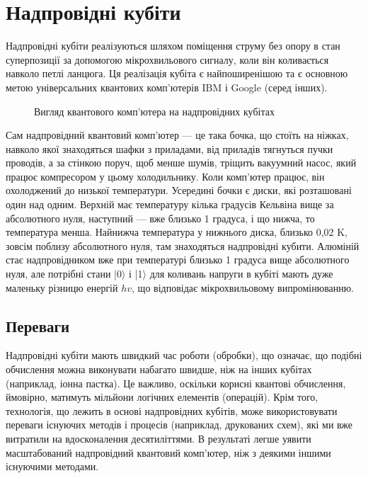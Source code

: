 \documentclass[a4paper,14pt]{extreport}
\begin{document}
\chapter{Надпровідні кубіти}\par 
Надпровідні кубіти реалізуються шляхом поміщення струму без опору в стан суперпозиції за допомогою мікрохвильового сигналу, коли він коливається навколо петлі ланцюга. Ця реалізація кубіта є найпоширенішою та є основною метою універсальних квантових комп’ютерів IBM і Google (серед інших).
\begin{figure}[h!]
\caption{Вигляд квантового комп'ютера на надпровідних кубітах}
\end{figure}
Сам надпровідний квантовий комп'ютер — це така бочка, що стоїть на ніжках, навколо якої знаходяться шафки з приладами, від приладів тягнуться пучки проводів, а за стінкою поруч, щоб менше шумів, тріщить вакуумний насос, який працює компресором у цьому холодильнику. Коли комп'ютер працює, він охолоджений до низької температури. Усередині бочки є диски, які розташовані один над одним. Верхній має температуру кілька градусів Кельвіна вище за абсолютного нуля, наступний — вже близько 1 градуса, і що нижча, то температура менша. Найнижча температура у нижнього диска, близько 0,02 K, зовсім поблизу абсолютного нуля, там знаходяться надпровідні кубити. Алюміній стає надпровідником вже при температурі близько 1 градуса вище абсолютного нуля, але потрібні стани |0$\rangle$ і |1$\rangle$ для коливань напруги в кубіті мають дуже маленьку різницю енергій $hv$, що відповідає мікрохвильовому випромінюванню.

\section{Переваги}
Надпровідні кубіти мають швидкий час роботи (обробки), що означає, що подібні обчислення можна виконувати набагато швидше, ніж на інших кубітах (наприклад, іонна пастка). Це важливо, оскільки корисні квантові обчислення, ймовірно, матимуть мільйони логічних елементів (операцій). Крім того, технологія, що лежить в основі надпровідних кубітів, може використовувати переваги існуючих методів і процесів (наприклад, друкованих схем), які ми вже витратили на вдосконалення десятиліттями. В результаті легше уявити масштабований надпровідний квантовий комп’ютер, ніж з деякими іншими існуючими методами.
\end{document}
